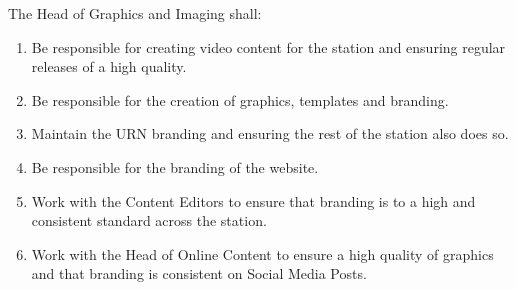 \item The Head of Graphics and Imaging shall:
\begin{enumerate}[label*=\arabic*.]
    \item Be responsible for creating video content for the station and ensuring regular releases of a high quality.
    \item Be responsible for the creation of graphics, templates and branding.
    \item Maintain the URN branding and ensuring the rest of the station also does so.
    \item Be responsible for the branding of the website.
    \item Work with the Content Editors to ensure that branding is to a high and consistent standard across the station.
    \item Work with the Head of Online Content to ensure a high quality of graphics and that branding is consistent on Social Media Posts.
\end{enumerate}

